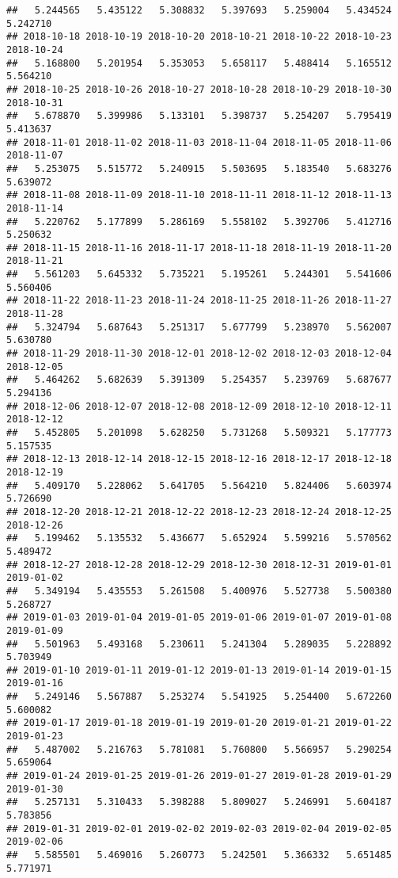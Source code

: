 \documentclass[
]{article}
\begin{document}
\begin{verbatim}
##   5.244565   5.435122   5.308832   5.397693   5.259004   5.434524   5.242710 
## 2018-10-18 2018-10-19 2018-10-20 2018-10-21 2018-10-22 2018-10-23 2018-10-24 
##   5.168800   5.201954   5.353053   5.658117   5.488414   5.165512   5.564210 
## 2018-10-25 2018-10-26 2018-10-27 2018-10-28 2018-10-29 2018-10-30 2018-10-31 
##   5.678870   5.399986   5.133101   5.398737   5.254207   5.795419   5.413637 
## 2018-11-01 2018-11-02 2018-11-03 2018-11-04 2018-11-05 2018-11-06 2018-11-07 
##   5.253075   5.515772   5.240915   5.503695   5.183540   5.683276   5.639072 
## 2018-11-08 2018-11-09 2018-11-10 2018-11-11 2018-11-12 2018-11-13 2018-11-14 
##   5.220762   5.177899   5.286169   5.558102   5.392706   5.412716   5.250632 
## 2018-11-15 2018-11-16 2018-11-17 2018-11-18 2018-11-19 2018-11-20 2018-11-21 
##   5.561203   5.645332   5.735221   5.195261   5.244301   5.541606   5.560406 
## 2018-11-22 2018-11-23 2018-11-24 2018-11-25 2018-11-26 2018-11-27 2018-11-28 
##   5.324794   5.687643   5.251317   5.677799   5.238970   5.562007   5.630780 
## 2018-11-29 2018-11-30 2018-12-01 2018-12-02 2018-12-03 2018-12-04 2018-12-05 
##   5.464262   5.682639   5.391309   5.254357   5.239769   5.687677   5.294136 
## 2018-12-06 2018-12-07 2018-12-08 2018-12-09 2018-12-10 2018-12-11 2018-12-12 
##   5.452805   5.201098   5.628250   5.731268   5.509321   5.177773   5.157535 
## 2018-12-13 2018-12-14 2018-12-15 2018-12-16 2018-12-17 2018-12-18 2018-12-19 
##   5.409170   5.228062   5.641705   5.564210   5.824406   5.603974   5.726690 
## 2018-12-20 2018-12-21 2018-12-22 2018-12-23 2018-12-24 2018-12-25 2018-12-26 
##   5.199462   5.135532   5.436677   5.652924   5.599216   5.570562   5.489472 
## 2018-12-27 2018-12-28 2018-12-29 2018-12-30 2018-12-31 2019-01-01 2019-01-02 
##   5.349194   5.435553   5.261508   5.400976   5.527738   5.500380   5.268727 
## 2019-01-03 2019-01-04 2019-01-05 2019-01-06 2019-01-07 2019-01-08 2019-01-09 
##   5.501963   5.493168   5.230611   5.241304   5.289035   5.228892   5.703949 
## 2019-01-10 2019-01-11 2019-01-12 2019-01-13 2019-01-14 2019-01-15 2019-01-16 
##   5.249146   5.567887   5.253274   5.541925   5.254400   5.672260   5.600082 
## 2019-01-17 2019-01-18 2019-01-19 2019-01-20 2019-01-21 2019-01-22 2019-01-23 
##   5.487002   5.216763   5.781081   5.760800   5.566957   5.290254   5.659064 
## 2019-01-24 2019-01-25 2019-01-26 2019-01-27 2019-01-28 2019-01-29 2019-01-30 
##   5.257131   5.310433   5.398288   5.809027   5.246991   5.604187   5.783856 
## 2019-01-31 2019-02-01 2019-02-02 2019-02-03 2019-02-04 2019-02-05 2019-02-06 
##   5.585501   5.469016   5.260773   5.242501   5.366332   5.651485   5.771971 

\end{verbatim}
\end{document}
